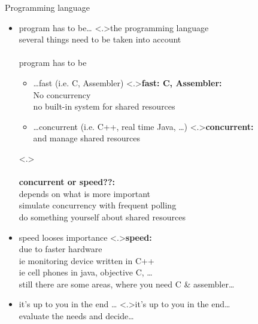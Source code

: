 \documentclass[ngerman={babel}, utf8, bigger, t, xcolor={table,dvipsnames}, ompress, hyperref={bookmarks,colorlinks},red]{beamer}
\begin{document}
\begin{frame}{Programming language}
	\begin{itemize}
		\item program has to be\dots
		\note<.>{the programming language \\ several things need to be taken into account\\ \ \\ program has to be}
			\begin{itemize}
				\item \dots fast (i.e. C, Assembler)
				\note<.>{\textbf{fast: C, Assembler:}\\ No concurrency \\ no built-in system for shared resources}
				\item \dots concurrent (i.e. C++, real time Java, \dots){}
				\note<.>{\textbf{concurrent:}\\ and manage shared resources}
			\end{itemize}
			\note<.>{\\ \ \\ \textbf{concurrent or speed??:}\\ depends on what is more important \\ simulate concurrency with frequent polling \\ do something yourself about shared resources}
			\item speed looses importance
			\note<.>{\textbf{speed:}\\ due to faster hardware \\ ie monitoring device written in C++ \\ ie cell phones in java, objective C, \dots \\ still there are some areas, where you need C \& assembler\dots}
			\item it's up to you in the end \dots
			\note<.>{it's up to you in the end\dots \\ evaluate the needs and decide\dots}
	\end{itemize}
\end{frame}
\end{document}
